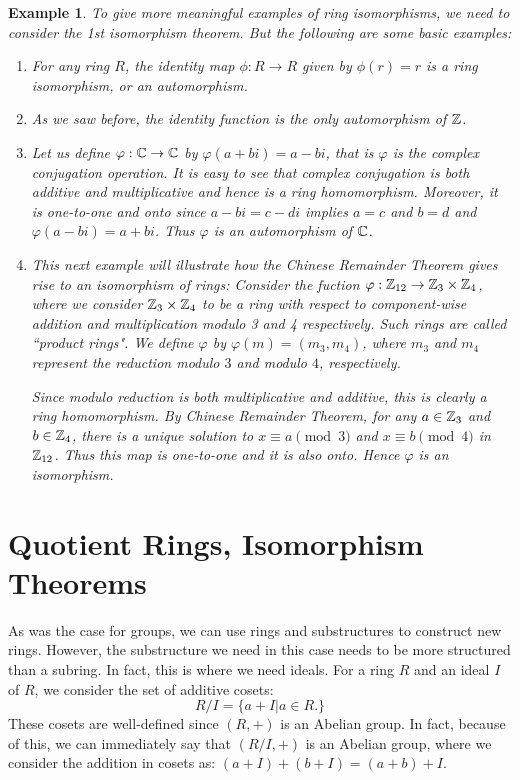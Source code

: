 \documentclass[12pt]{article}
\theoremstyle{plain}
\newtheorem{example}{Example}
\theoremstyle{definition}
\theoremstyle{remark}
\begin{document}
\begin{example} To give more meaningful examples of ring isomorphisms, we need to consider the 1st isomorphism theorem. But the following are some basic examples:
\begin{enumerate}
    \item For any ring $R$, the identity map $\phi:R\rightarrow R$ given by $\phi(r)=r$ is a ring isomorphism, or an automorphism.
    \item As we saw before, the identity function is the only automorphism of $\mathbb{Z}$.
    \item Let us define $\varphi:\mathbb{C} \rightarrow \mathbb{C}$ by $\varphi(a+bi)=a-bi$, that is $\varphi$ is the complex conjugation operation. It is easy to see that complex conjugation is both additive and multiplicative and hence is a ring homomorphism. Moreover, it is one-to-one and onto since $a-bi=c-di$ implies $a=c$ and $b=d$ and $\varphi(a-bi)=a+bi$. Thus $\varphi$ is an automorphism of $\mathbb{C}$.
    \item This next example will illustrate how the Chinese Remainder Theorem gives rise to an isomorphism of rings:
    Consider the fuction $\varphi:\mathbb{Z}_{12}\rightarrow \mathbb{Z}_{3}\times \mathbb{Z}_{4}$, where we consider $\mathbb{Z}_3\times \mathbb{Z}_4$ to be a ring with respect to component-wise addition and multiplication modulo 3 and 4 respectively. Such rings are called ``product rings".
    We define $\varphi$ by $\varphi(m) = (m_3, m_4)$, where $m_3$ and $m_4$ represent the reduction modulo $3$ and modulo $4$, respectively.

    Since modulo reduction is both multiplicative and additive, this is clearly a ring homomorphism. By Chinese Remainder Theorem, for any $a \in \mathbb{Z}_3$ and $b\in \mathbb{Z}_4$, there is a unique solution to  $x\equiv a \pmod{3}$ and $x\equiv b\pmod{4}$ in $\mathbb{Z}_{12}$. Thus this map is one-to-one and it is also onto. Hence $\varphi$ is an isomorphism.
 \end{enumerate}
\end{example}

\section{Quotient Rings, Isomorphism Theorems}
As was the case for groups, we can use rings and substructures to construct new rings. However, the substructure we need in this case needs to be more structured than a subring. In fact, this is where we need ideals. For a ring $R$ and an ideal $I$ of $R$, we consider the set of additive cosets:
$$R/I = \{a+I|a\in R.\}$$
These cosets are well-defined since $(R,+)$ is an Abelian group. In fact, because of this, we can immediately say that $(R/I,+)$ is an Abelian group, where we consider the addition in cosets as: $(a+I)+(b+I) = (a+b)+I$.
\end{document}
